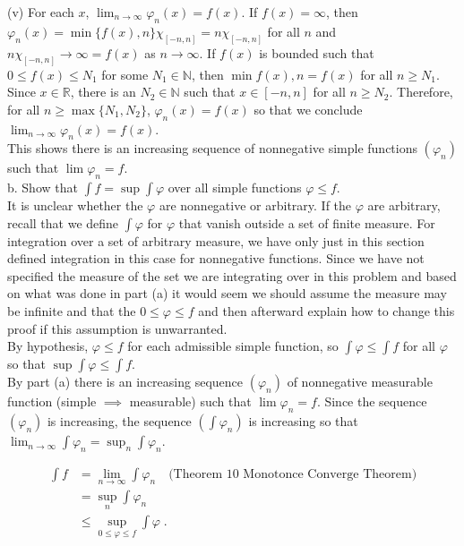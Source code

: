 \documentclass[a4paper]{article}
\begin{document}
(v) For each $x$, $\lim_{n\rightarrow \infty} \varphi_n (x) = f(x)$. If $f(x) = \infty$, then $\varphi_n(x) =\min \{f(x), n\}\chi_{[-n,n]} = n\chi_{[-n,n]}$ for all $n$ and $n\chi_{[-n,n]} \rightarrow \infty = f(x)$ as $n\rightarrow \infty$. If $f(x)$ is bounded such that $0 \leq f(x) \leq N_1$ for some $N_1 \in \mathbb{N}$, then $\min{f(x), n} = f(x)$ for all $n \geq N_1$. Since $x \in \mathbb{R}$, there is an $N_2 \in \mathbb{N}$ such that $x \in [-n,n]$ for all $n \geq N_2$. Therefore, for all $n \geq \max \{N_1,N_2\}$, $\varphi_n(x) = f(x)$ so that we conclude $\lim_{n\rightarrow \infty} \varphi_{n}(x) =f(x)$. \\

This shows there is an increasing sequence of nonnegative simple functions $(\varphi_n)$ such that $\lim \varphi_n = f$. \\


b. Show that $\int f = \sup \int \varphi$ over all simple functions $\varphi \leq f$. \\

It is unclear whether the $\varphi$ are nonnegative or arbitrary. If the $\varphi$ are arbitrary, recall that we define $\int \varphi$ for $\varphi$ that vanish outside a set of finite measure. For integration over a set of arbitrary measure, we have only just in this section defined integration in this case for nonnegative functions. Since we have not specified the measure of the set we are integrating over in this problem and based on what was done in part (a) it would seem we should assume the measure may be infinite and that the $0 \leq \varphi \leq f$ and then afterward explain how to change this proof if this assumption is unwarranted.\\

By hypothesis, $\varphi \leq f$ for each admissible simple function, so $\int \varphi \leq \int f$ for all $\varphi$ so that $\sup \int \varphi \leq \int f$. \\

By part (a) there is an increasing sequence $(\varphi_n)$ of nonnegative measurable function (simple $\implies$ measurable) such that $\lim \varphi_n = f$. Since the sequence $(\varphi_n)$ is increasing, the sequence $(\int \varphi_n)$ is increasing so that $\lim_{n\rightarrow \infty} \int \varphi_n = \sup_{n} \int \varphi_n$. 

\begin{align*}
\int f & = \lim_{n\rightarrow \infty} \int \varphi_n \quad \text{(Theorem 10 Monotonce Converge Theorem)} \\
&= \sup_{n} \int \varphi_n \\
&\leq \sup_{0\leq \varphi \leq f} \int \varphi \;.
\end{align*}
\end{document}

